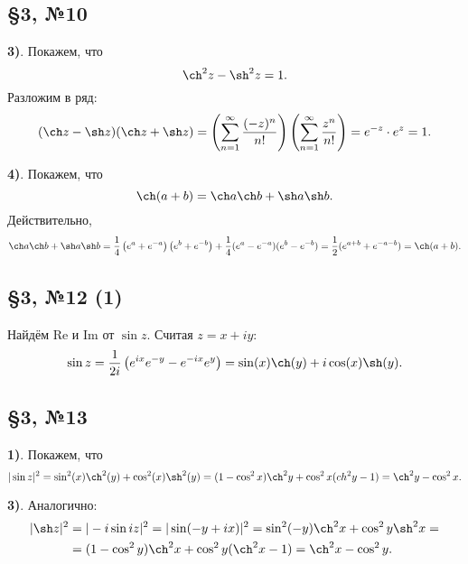 \subsection*{\S3, №10}

\textbf{3)}. Покажем, что
\begin{equation*}
    \ch^2 z - \sh^2 z = 1.
\end{equation*}
Разложим в ряд:
\begin{equation*}
    (\ch z - \sh z) (\ch z + \sh z) = 
    \left(
        \sum_{n=1}^{\infty} \frac{(-z)^n}{n!}
    \right) \left(
        \sum_{n=1}^{\infty} \frac{z^n}{n!}
    \right) = e^{-z} \cdot e^z = 1.
\end{equation*}

\textbf{4)}.  Покажем, что
\begin{equation*}
    \ch (a + b) = \ch a \ch b + \sh a \sh b.
\end{equation*}
Действительно,
\begin{equation*}
    \ch a \ch b + \sh a \sh b = \frac{1}{4} \left(e^a + e^{-a}\right) \left(e^b + e^{-b}\right) + \frac{1}{4} (e^a - e^{-a})(e^b - e^{-b}) = \frac{1}{2} (e^{a+b} + e^{-a - b}) = \ch(a + b).
\end{equation*}


\subsection*{\S3, №12 (1)}

Найдём Re и Im от $\sin z$. Считая $z = x + i y$:
\begin{equation*}
    \sin z = \frac{1}{2i}\left(e^{ix} e^{-y} - e^{-ix} e^y\right) = 
    \sin (x) \ch(y) + i \cos(x) \sh (y).
\end{equation*}


\subsection*{\S3, №13}

\textbf{1)}. Покажем, что
\begin{equation*}
    |\sin z|^2 = \sin^2 (x) \ch^2 (y) + \cos^2 (x) \sh^2 (y) = 
    (1 - \cos^2 x) \ch^2 y + \cos^2 x (ch^2 y -1) = \ch^2 y - \cos^2 x.
\end{equation*}


\textbf{3)}. Аналогично:
\begin{align*}
    |\sh z|^2 &= |-i \sin i z|^2 = |\sin(-y + ix)|^2 =  \sin^2 (-y) \ch^2 x + \cos^2 y \sh^2 x = \\
    &= (1- \cos^2 y) \ch^2 x + \cos^2 y (\ch^2 x - 1) = \ch^2 x - \cos^2 y.
\end{align*}




